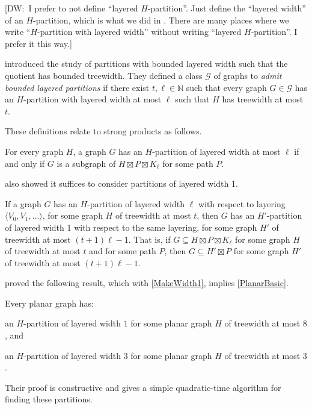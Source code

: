 \documentclass{patmorin}
\newcommand{\note}[2]{{\color{red}[#1:~#2]}}
\begin{document}
\note{DW}{I  prefer to not define ``layered $H$-partition''. Just define the ``layered width'' of an $H$-partition, which is what we did in \citep{dujmovic.joret.ea:planar}. There are many places where we write ``$H$-partition with layered width'' without writing ``layered $H$-partition''. I prefer it this way.}

\citet{dujmovic.joret.ea:planar} introduced the study of partitions with bounded layered width such that the quotient has bounded treewidth. They defined a class $\mathcal{G}$ of graphs to \emph{admit bounded layered partitions} if there exist $t,\ell\in\mathbb{N}$ such that every graph $G\in \mathcal{G}$ has an $H$-partition with layered width at most $\ell$ such that $H$ has treewidth at most $t$. 

These definitions relate to strong products as follows. 

\begin{lem} 
\label{PartitionProduct}
For every graph $H$, a graph $G$ has an $H$-partition of layered width at most $\ell$ if and only if $G$ is a subgraph of 
$H \boxtimes P \boxtimes K_\ell$ for some path $P$.
\end{lem}

\citet{dujmovic.joret.ea:planar} also showed it suffices to consider partitions of layered width 1.

\begin{lem} 
\label{MakeWidth1}
If a graph $G$ has an $H$-partition of layered width $\ell$ with respect to layering $\langle V_0,V_1,\dots\rangle$, for some graph $H$ of treewidth at most $t$, then $G$ has an $H'$-partition of layered width 1 with respect to the same layering, for some graph $H'$ of treewidth at most $(t+1)\ell-1$.  That is, if $G\subseteq H\boxtimes P\boxtimes K_\ell$ for some graph $H$ of treewidth at most $t$  and for some path $P$, then $G\subseteq H' \boxtimes P$ for some graph $H'$ of treewidth at most $(t+1)\ell-1$.
\end{lem}

\citet{dujmovic.joret.ea:planar} proved the following result, which with \cref{MakeWidth1}, implies \cref{PlanarBasic}. 

\begin{thm}
\label{PlanarPartition}
Every planar graph has:
\begin{compactenum}[(a)]
\item an $H$-partition of layered width $1$ for some planar graph $H$ of treewidth at most $8$, and
\item an $H$-partition of layered width $3$ for some planar graph $H$ of treewidth at most $3$.
\end{compactenum}
\end{thm}
Their proof is constructive and gives a simple quadratic-time algorithm for finding these partitions.
\end{document}
